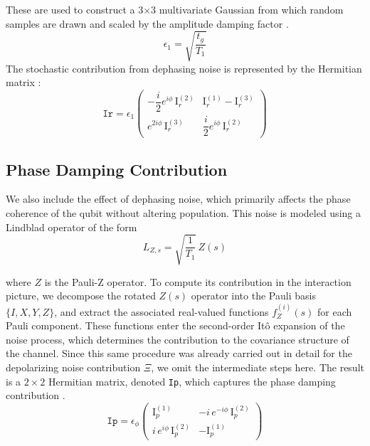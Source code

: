 \documentclass[9pt,a4paper,twocolumn,twoside]{tau-class/tau}
\begin{document}
These are used to construct a 3×3 multivariate Gaussian from which random samples are drawn and scaled by the amplitude damping factor \cite{dibartolomeo2023noisy}.
\begin{equation}
    \epsilon_1 = \sqrt{\frac{t_g}{T_1}}
\end{equation}
The stochastic contribution from dephasing noise is represented by the Hermitian matrix \cite{quantum_gates_repo}:
\begin{equation}
    \texttt{Ir} = \epsilon_1 \begin{pmatrix}
-\dfrac{i}{2} e^{i\phi} \, \text{I}_r^{(2)} & \text{I}_r^{(1)} - \text{I}_r^{(3)} \\
e^{2i\phi} \, \text{I}_r^{(3)} & \dfrac{i}{2} e^{i\phi} \, \text{I}_r^{(2)}
\end{pmatrix}
\end{equation}

\subsection{Phase Damping Contribution}
We also include the effect of dephasing noise, which primarily affects the phase coherence of the qubit without altering population. This noise is modeled using a Lindblad operator of the form 
\begin{equation}
    L_{Z,s} = \sqrt{\frac{1}{T_1}} \, Z(s)
\end{equation}

where $Z$ is the Pauli-Z operator. To compute its contribution in the interaction picture, we decompose the rotated $Z(s)$ operator into the Pauli basis $\{I, X, Y, Z\}$, and extract the associated real-valued functions $f_Z^{(i)}(s)$ for each Pauli component. These functions enter the second-order Itô expansion of the noise process, which determines the contribution to the covariance structure of the channel. Since this same procedure was already carried out in detail for the depolarizing noise contribution $\Xi$, we omit the intermediate steps here. The result is a $2 \times 2$ Hermitian matrix, denoted \texttt{Ip}, which captures the phase damping contribution \cite{quantum_gates_repo}.
\begin{equation}
    \texttt{Ip} = \epsilon_\phi \begin{pmatrix}
\text{I}_p^{(1)} & -i \, e^{-i\phi} \, \text{I}_p^{(2)} \\
i \, e^{i\phi} \, \text{I}_p^{(2)} & -\text{I}_p^{(1)}
\label{eq: Ip}
\end{pmatrix}
\end{equation}
\end{document}

